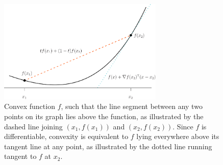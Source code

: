 \begin{figure}[tb]
\centering
\includegraphics[width=0.7\textwidth]{fig/convex_function.pdf}
\caption{Convex function $f$, such that the line segment between any two points   
  on its graph lies above the function, as illustrated by the dashed line
  joining $(x_1,f(x_1))$ and $(x_2,f(x_2))$. Since $f$ is differentiable,
  convexity is equivalent to $f$ lying everywhere above its tangent line at any
  point, as illustrated by the dotted line running tangent to $f$ at $x_2$.}   
\label{fig:convex_function}
\end{figure}


